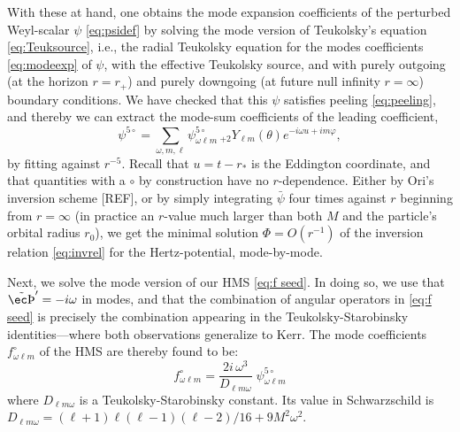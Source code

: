 \documentclass[%
reprint,
 prd,
superscriptaddress,
nofootinbib,
aps,
dvipsnames
]{revtex4-2}
\newcommand{\emm}{m}
\def\thpH{\tilde{\th}'}
\def\th{\hbox{\ec\char'336}}
\def\th{\hbox{\ec\char'336}}
\def\Dlw{D_{\ell\emm\omega}}                %
\def\fHo{f^{\circ}}
\begin{document}
With these at hand, one obtains the mode expansion coefficients of the perturbed Weyl-scalar $\psi$ \eqref{eq:psidef} by solving the mode version of Teukolsky's equation \eqref{eq:Teuksource}, i.e., the radial Teukolsky equation for the modes coefficients \eqref{eq:modeexp} of $\psi$, with the effective Teukolsky source, and with purely outgoing (at the horizon $r=r_+$) and purely downgoing (at future null infinity $r=\infty$) boundary conditions. We have checked that this $\psi$ satisfies peeling \eqref{eq:peeling}, and thereby we can extract the mode-sum coefficients of the leading coefficient,
\begin{equation}
    \psi^{5\circ} = \sum_{\omega,m,\ell} \psi^{5\circ}_{\omega \ell m} \, {}_{+2} Y_{\ell m}(\theta) e^{-i\omega u + im\varphi},
\end{equation}
by fitting against $r^{-5}$. Recall that  $u=t-r_*$ is the Eddington coordinate, and that quantities with a $\circ$ by construction have no $r$-dependence.
Either by Ori's inversion scheme [REF], or by simply 
integrating $\bar\psi$ four times against $r$ beginning from $r=\infty$ (in practice an $r$-value much larger than both $M$ and the particle's orbital radius $r_0$), we get the minimal solution $\Phi = O(r^{-1})$ of the inversion relation \eqref{eq:invrel} for the Hertz-potential, mode-by-mode.

Next, we solve the mode version of our HMS \eqref{eq:f seed}. In doing so, we use that $\thpH = -i\omega$ in modes, and that the combination of angular operators in \eqref{eq:f seed} is precisely the combination appearing in the Teukolsky-Starobinsky identities---where both observations generalize to Kerr. The mode coefficients $f^\circ_{\omega \ell m}$ of the HMS are thereby found to be:
\begin{equation}\label{eq:f mode kerr}
\fHo_{\omega\ell m}
=
\frac{2i\,\omega^{3}}{\Dlw}\;\psi^{5 \circ}_{\omega \ell m}
\end{equation}
where $\Dlw$ is a Teukolsky-Starobinsky constant. 
Its value in Schwarzschild is $\Dlw=(\ell+1)\ell(\ell-1)(\ell-2)/16 + 9M^2 \omega^2$. 
\end{document}
